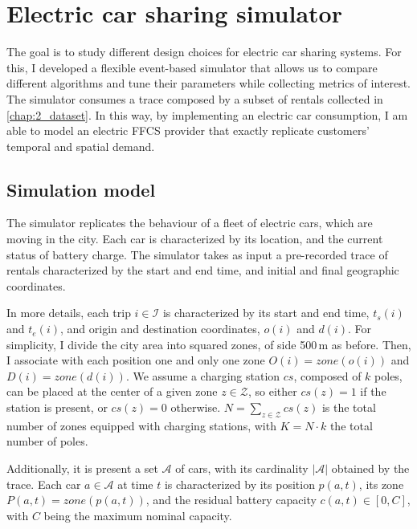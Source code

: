 \section{Electric car sharing simulator}
\label{sec:5_1Modelling}

The goal is to study different design choices for electric car sharing systems. For this, I developed a flexible event-based simulator that allows us to compare different algorithms and tune their parameters while collecting metrics of interest. The simulator consumes a trace composed by a subset of rentals collected in \ref{chap:2_dataset}. In this way, by implementing an electric car consumption, I am able to model an electric FFCS provider that exactly replicate customers' temporal and spatial demand.

\subsection{Simulation model}

The simulator replicates the behaviour of a fleet of electric cars, which are moving in the city. Each car is characterized by its location, and the current status of battery charge. The simulator takes as input a pre-recorded trace of rentals characterized by the start and end time, and initial and final geographic coordinates.

In more details, each trip $i \in \mathcal{I}$  is characterized by its start and end time, $t_{s}(i)$ and $t_{e}(i)$, and origin and destination coordinates, $o(i)$ and $d(i)$. For simplicity, I divide the city area into squared zones, of side 500\,m as before. Then, I associate with each position one and only one zone $O(i)=zone(o(i))$ and $D(i)=zone(d(i))$. We assume a charging station $cs$, composed of $k$ poles, can be placed at the center of a given zone $z\in \mathcal{Z}$, so either $cs(z)=1$ if the station is present, or $cs(z)=0$ otherwise. $N=\sum_{z\in \mathcal{Z}}cs(z)$ is the total number of zones equipped with charging stations, with 
$K=N\cdot k$ the total number of poles.


Additionally, it is present a set $\mathcal{A}$ of cars, with its cardinality $\left\vert{\mathcal{A}}\right\vert$ obtained by the trace. Each car $a\in \mathcal{A}$ at time $t$ is characterized by its position $p(a,t)$, its zone $P(a,t)=zone(p(a,t))$, and the residual battery capacity $c(a,t)\in[0,C]$, with $C$ being the maximum nominal capacity.


